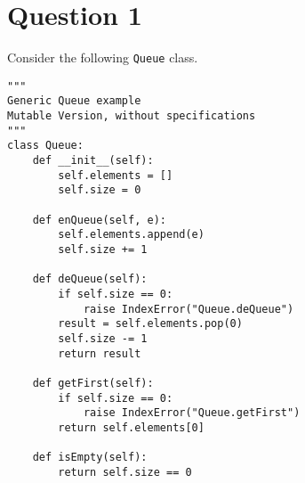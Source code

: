 \documentclass[10pt]{article}
\newcommand{\code}[1]{\texttt{#1}}
\begin{document}
\newpage
\section{Question 1}
Consider the following \code{Queue} class.

\begin{lstlisting}
"""
Generic Queue example
Mutable Version, without specifications
"""
class Queue:
    def __init__(self):
        self.elements = []
        self.size = 0

    def enQueue(self, e):
        self.elements.append(e)
        self.size += 1

    def deQueue(self):
        if self.size == 0:
            raise IndexError("Queue.deQueue")
        result = self.elements.pop(0)
        self.size -= 1
        return result

    def getFirst(self):
        if self.size == 0:
            raise IndexError("Queue.getFirst")
        return self.elements[0]

    def isEmpty(self):
        return self.size == 0

\end{lstlisting}
\end{document}
